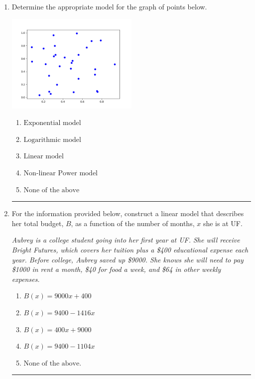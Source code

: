\documentclass[14pt]{extbook}
\newcommand{\litem}[1]{\item#1\hspace*{-1cm}\rule{\textwidth}{0.4pt}}
\begin{document}
\begin{enumerate}
{\begin{enumerate}[label=\Alph*.]
\end{enumerate} }
\litem{
Determine the appropriate model for the graph of points below.
\begin{center}
    \includegraphics[width=0.5\textwidth]{../Figures/identifyModelGraph12CopyA.png}
\end{center}
\begin{enumerate}[label=\Alph*.]
\item \( \text{Exponential model} \)
\item \( \text{Logarithmic model} \)
\item \( \text{Linear model} \)
\item \( \text{Non-linear Power model} \)
\item \( \text{None of the above} \)

\end{enumerate} }
\litem{
For the information provided below, construct a linear model that describes her total budget, $B$, as a function of the number of months, $x$ she is at UF.
\begin{center}
    \textit{ Aubrey is a college student going into her first year at UF. She will receive Bright Futures, which covers her tuition plus a \$400 educational expense each year. Before college, Aubrey saved up \$9000. She knows she will need to pay \$1000 in rent a month, \$40 for food a week, and \$64 in other weekly expenses. }
\end{center}
\begin{enumerate}[label=\Alph*.]
\item \( B(x) = 9000 x + 400 \)
\item \( B(x) = 9400 - 1416 x \)
\item \( B(x) = 400 x + 9000 \)
\item \( B(x) = 9400 - 1104 x \)
\item \( \text{None of the above.} \)


\end{enumerate}}
\end{enumerate}
\end{document}
